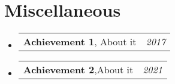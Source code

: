 \documentclass[a4paper,11pt]{article}
\makeatletter
\newcommand{\resumePOR}[3]{
\vspace{0.5mm}\item
    \begin{tabular*}{0.97\textwidth}[t]{l@{\extracolsep{\fill}}r}
        \textbf{#1},\hspace{0.3mm}#2 & \textit{\small{#3}} 
    \end{tabular*}
    \vspace{-2mm}
}
\newcommand{\resumeSubHeadingListStart}{\begin{itemize}[leftmargin=*,labelsep=0mm]}
\newcommand{\resumeSubHeadingListEnd}{\end{itemize}\vspace{2mm}}
\makeatother
\begin{document}
\section{\textbf{Miscellaneous}}
\vspace{-0.1mm}
\resumeSubHeadingListStart
\resumePOR{Achievement 1} %
    { About it} %
    {2017} %
\vspace{-0.1mm}
\resumePOR{Achievement 2} %
    {About it} %
    {2021} %
\vspace{-0.1mm}
\resumeSubHeadingListEnd
\vfill
{}
\end{document}
